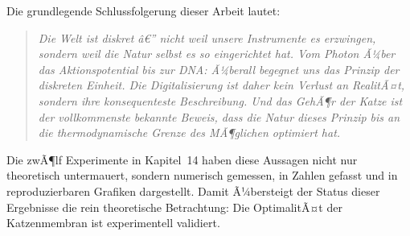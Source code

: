 ﻿\documentclass[12pt,a4paper,titlepage]{report}
\begin{document}
Die grundlegende Schlussfolgerung dieser Arbeit lautet:

\begin{quote}
	\itshape
	Die Welt ist diskret â€” nicht weil unsere Instrumente es erzwingen,
	sondern weil die Natur selbst es so eingerichtet hat.
	Vom Photon Ã¼ber das Aktionspotential bis zur DNA: Ã¼berall begegnet uns
	das Prinzip der diskreten Einheit.
	Die Digitalisierung ist daher kein Verlust an RealitÃ¤t, sondern
	ihre konsequenteste Beschreibung.
	Und das GehÃ¶r der Katze ist der vollkommenste bekannte Beweis,
	dass die Natur dieses Prinzip bis an die thermodynamische Grenze
	des MÃ¶glichen optimiert hat.
\end{quote}

Die zwÃ¶lf Experimente in Kapitel~14 haben diese Aussagen nicht nur
theoretisch untermauert, sondern numerisch gemessen, in Zahlen gefasst
und in reproduzierbaren Grafiken dargestellt.
Damit Ã¼bersteigt der Status dieser Ergebnisse die rein theoretische
Betrachtung: Die OptimalitÃ¤t der Katzenmembran ist experimentell validiert.
\end{document}
